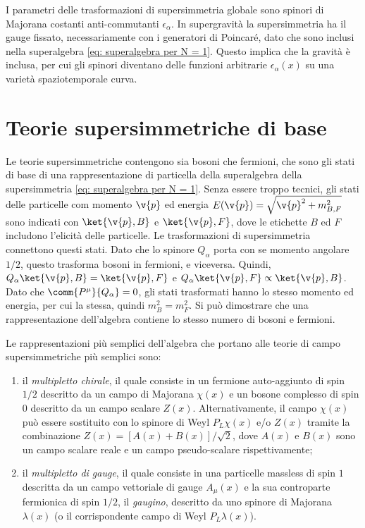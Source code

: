 I parametri delle trasformazioni di supersimmetria globale sono spinori di Majorana costanti anti-commutanti $\epsilon_\alpha$. In supergravità la supersimmetria ha il gauge fissato, necessariamente con i generatori di Poincaré, dato che sono inclusi nella superalgebra \eqref{eq: superalgebra per N = 1}. Questo implica che la gravità è inclusa, per cui gli spinori diventano delle funzioni arbitrarie $\epsilon_\alpha(x)$ su una varietà spaziotemporale curva. 

\section{Teorie supersimmetriche di base}
Le teorie supersimmetriche contengono sia bosoni che fermioni, che sono gli stati di base di una rappresentazione di particella della superalgebra della supersimmetria \eqref{eq: superalgebra per N = 1}. Senza essere troppo tecnici, gli stati delle particelle com momento $\v{p}$ ed energia $E(\v{p}) = \sqrt{\v{p}^2 + m_{B,F}^2}$ sono indicati con $\ket{\v{p},B}$ e $\ket{\v{p},F}$, dove le etichette $B$ ed $F$ includono l'elicità delle particelle. Le trasformazioni di supersimmetria connettono questi stati. Dato che lo spinore $Q_\alpha$ porta con se momento angolare $1/2$, questo trasforma bosoni in fermioni, e viceversa. Quindi, $Q_\alpha\ket{\v{p},B} = \ket{\v{p},F}$ e $Q_\alpha\ket{\v{p},F} \propto \ket{\v{p},B}$. Dato che $\comm{P^\mu}{Q_\alpha} = 0$, gli stati trasformati hanno lo stesso momento ed energia, per cui la stessa, quindi $m_B^2 = m_F^2$. Si può dimostrare che una rappresentazione dell'algebra contiene lo stesso numero di bosoni e fermioni.

Le rappresentazioni più semplici dell'algebra che portano alle teorie di campo supersimmetriche più semplici sono:
\begin{enumerate}
    \item il \emph{multipletto chirale}, il quale consiste in un fermione auto-aggiunto di spin $1/2$ descritto da un campo di Majorana $\chi(x)$ e un bosone complesso di spin $0$ descritto da un campo scalare $Z(x)$. Alternativamente, il campo $\chi(x)$ può essere sostituito con lo spinore di Weyl $P_L\chi(x)$ e/o $Z(x)$ tramite la combinazione $Z(x) = [A(x) + B(x)]/\sqrt{2}$, dove $A(x)$ e $B(x)$ sono un campo scalare reale e un campo pseudo-scalare rispettivamente;
    \item il \emph{multipletto di gauge}, il quale consiste in una particelle massless di spin $1$ descritta da un campo vettoriale di gauge $A_\mu(x)$ e la sua controparte fermionica di spin $1/2$, il \emph{gaugino}, descritto da uno spinore di Majorana $\lambda(x)$ (o il corrispondente campo di Weyl $P_L\lambda(x)$).
\end{enumerate}

